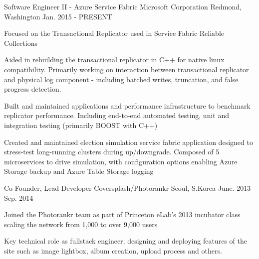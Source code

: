 

\begin{cventries}

  \cventry
    {Software Engineer II - Azure Service Fabric} %
    {Microsoft Corporation} %
    {Redmond, Washington} %
    {Jan. 2015 - PRESENT} %
    {
      \begin{cvitems} %
        \item {Focused on the Transactional Replicator used in Service Fabric Reliable Collections}
        \item {Aided in rebuilding the transactional replicator in C++ for native linux compatibility. Primarily working on interaction between transactional replicator and physical log component - including batched writes, truncation, and false progress detection.}
        \item {Built and maintained applications and performance infrastructure to benchmark replicator performance. Including end-to-end automated testing, unit and integration testing (primarily BOOST with C++)}
        \item {Created and maintained election simulation service fabric application designed to stress-test long-running clusters during up/downgrade. Composed of 5 microservices to drive simulation, with configuration options enabling Azure Storage backup and Azure Table Storage logging}
      \end{cvitems}
    }

  \cventry
    {Co-Founder, Lead Developer} %
    {Coversplash/Photorankr} %
    {Seoul, S.Korea} %
    {June. 2013 - Sep. 2014} %
    {
      \begin{cvitems} %
        \item {Joined the Photorankr team as part of Princeton eLab’s 2013 incubator class scaling the network from 1,000 to over 9,000 users}
        \item {Key technical role as fullstack engineer, designing and deploying features of the site such as image lightbox, album creation, upload process and others.}
      \end{cvitems}
    }

\end{cventries}
